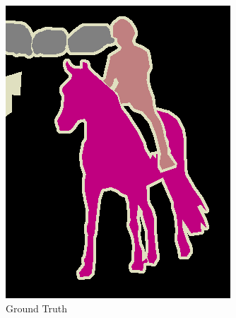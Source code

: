 \begin{figure}[t]
\begin{subfigure}[b]{0.244\textwidth}
    \includegraphics[width=\textwidth]{gfx/app-segmentation-2}
    \caption{Ground Truth}
  \end{subfigure}
  \hfill
  \begin{subfigure}[b]{0.244\textwidth}

\end{subfigure}
\end{figure}
